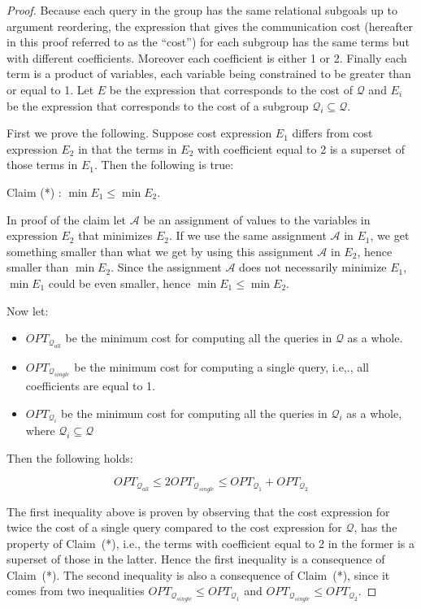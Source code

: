 \begin{proof}
Because each query in the group has the same relational subgoals up to argument reordering,  the expression that gives the communication cost (hereafter in this proof referred to as the ``cost'') for each subgroup has the same terms but with different coefficients.
Moreover each coefficient is either 1 or 2. Finally each term is a product of variables, each variable being constrained to be greater than or equal to 1. Let $E$ be the expression that corresponds to the cost of ${\mathcal{Q}}$ and $E_i$ be the expression
that corresponds to the cost of a subgroup ${{\mathcal{Q}}_{i}} \subseteq {\mathcal{Q}}$.

First we prove the following. Suppose cost expression $E_1$ differs from cost expression $E_2$ in that the terms in $E_2$ with coefficient equal to 2 is a superset of those terms in $E_1$.  Then the following is true:

Claim (*) : $\min{E_1} \leq \min{E_2}$.

In proof of the claim let ${\mathcal{A}}$ be an assignment  of values to the variables in expression $E_2$   that minimizes $E_2$.
If we use the same assignment ${\mathcal{A}}$ in $E_1$, we get something smaller than
what we get by using this assignment ${\mathcal{A}}$ in $E_2$, hence smaller than
$\min{E_2}$. Since the assignment ${\mathcal{A}}$ does not necessarily minimize $E_1$, $\min{E_1}$ could be even smaller, hence $\min{E_1} \leq \min{E_2}$.

Now let:

\begin{itemize}
\item $OPT_{{{\mathcal{Q}}_{all}}}$ be the minimum cost for computing all the queries in ${\mathcal{Q}}$ as a whole.

\item $OPT_{{{\mathcal{Q}}_{single}}}$ be the minimum cost for computing a single query, i.e,., all coefficients are equal  to 1.
\item $OPT_{{{\mathcal{Q}}_{i}}}$ be the minimum cost for computing all the queries in ${{\mathcal{Q}}_{i}}$ as a whole, where ${{\mathcal{Q}}_{i}} \subseteq {\mathcal{Q}}$
\end{itemize}

Then the following holds:

$$OPT_{{{\mathcal{Q}}_{all}}} \leq 2OPT_{{{\mathcal{Q}}_{single}}} \leq OPT_{{{\mathcal{Q}}_{1}}} + OPT_{{{\mathcal{Q}}_{2}}}$$

The first inequality above is proven by observing that the cost expression for twice the cost of a single query compared to the
cost expression for ${\mathcal{Q}}$, has the property of Claim~(*), i.e., the terms with coefficient equal to 2 in the former is a superset
of those in the latter. Hence the first inequality is a consequence of Claim~(*). The second inequality is also a consequence of Claim~(*),
since it comes from two inequalities $OPT_{{{\mathcal{Q}}_{single}}} \leq OPT_{{{\mathcal{Q}}_{1}}}$ and $OPT_{{{\mathcal{Q}}_{single}}} \leq OPT_{{{\mathcal{Q}}_{2}}}$.
\end{proof}


